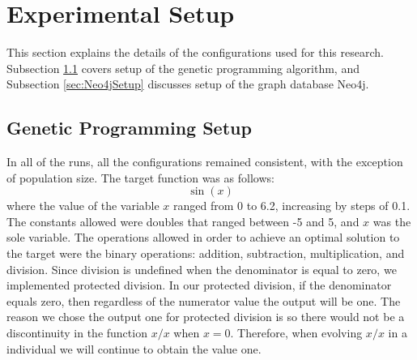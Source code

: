 \documentclass[12pt]{article}
\begin{document}








\section{Experimental Setup} 
\label{sec:experiments}

This section explains the details of the configurations used for this research. Subsection \ref{sec:GPSetup} covers setup of the genetic programming algorithm, and Subsection \ref{sec:Neo4jSetup} discusses setup of the graph database Neo4j.

\subsection{Genetic Programming Setup}
\label{sec:GPSetup}

In all of the runs, all the configurations remained consistent, with the exception of population size. The target function was as follows:
\[
	\sin(x)
\]
where the value of the variable $x$ ranged from 0 to 6.2, increasing by steps of 0.1. The constants allowed were doubles that ranged between -5 and 5, and $x$ was the sole variable. The operations allowed in order to achieve an optimal solution to the target were the binary operations: addition, subtraction, multiplication, and division. Since division is undefined when the denominator is equal to zero, we implemented protected division. In our protected division, if the denominator equals zero, then regardless of the numerator value the output will be one. The reason we chose the output one for protected division is so there would not be a discontinuity in the function $x/x$ when $x = 0$. Therefore, when evolving $x/x$ in a individual we will continue to obtain the value one.
\end{document}
